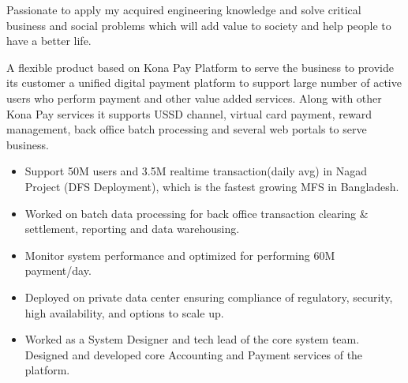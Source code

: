 \documentclass[10pt,a4paper,ragged2e]{altacv}
\begin{document}

\begin{fullwidth}
\makecvheader
\end{fullwidth}


Passionate to apply my acquired engineering knowledge and solve critical business and social problems which will add value to society and help people to have a better life.




A flexible product based on Kona Pay Platform to serve the business to provide its customer a unified digital payment platform to support large number of active users who perform payment and other value added services. Along with other Kona Pay services it supports USSD channel, virtual card payment, reward management, back office batch processing and several web portals to serve business.

  \begin{itemize}
    \item Support 50M users and 3.5M realtime transaction(daily avg) in Nagad Project (DFS Deployment), which is the fastest growing MFS in Bangladesh.
    \item Worked on batch data processing for back office transaction clearing \& settlement, reporting and data warehousing.
    \item Monitor system performance and optimized for performing 60M payment/day.
    \item Deployed on private data center ensuring compliance of regulatory, security, high availability, and options to scale up.
    \item Worked as a System Designer and tech lead of the core system team. Designed and developed core Accounting and Payment services of the platform.
  \end{itemize}
  
\end{document}
